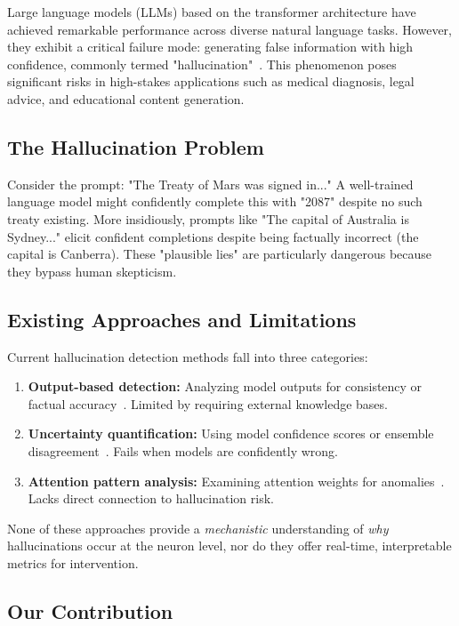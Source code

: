 Large language models (LLMs) based on the transformer architecture have achieved remarkable performance across diverse natural language tasks. However, they exhibit a critical failure mode: generating false information with high confidence, commonly termed "hallucination"~\cite{ji2023survey}. This phenomenon poses significant risks in high-stakes applications such as medical diagnosis, legal advice, and educational content generation.

\subsection{The Hallucination Problem}

Consider the prompt: "The Treaty of Mars was signed in..." A well-trained language model might confidently complete this with "2087" despite no such treaty existing. More insidiously, prompts like "The capital of Australia is Sydney..." elicit confident completions despite being factually incorrect (the capital is Canberra). These "plausible lies" are particularly dangerous because they bypass human skepticism.

\subsection{Existing Approaches and Limitations}

Current hallucination detection methods fall into three categories:

\begin{enumerate}
    \item \textbf{Output-based detection:} Analyzing model outputs for consistency or factual accuracy~\cite{manakul2023selfcheckgpt}. Limited by requiring external knowledge bases.
    \item \textbf{Uncertainty quantification:} Using model confidence scores or ensemble disagreement~\cite{kuhn2023semantic}. Fails when models are confidently wrong.
    \item \textbf{Attention pattern analysis:} Examining attention weights for anomalies~\cite{elhage2021mathematical}. Lacks direct connection to hallucination risk.
\end{enumerate}

None of these approaches provide a \textit{mechanistic} understanding of \textit{why} hallucinations occur at the neuron level, nor do they offer real-time, interpretable metrics for intervention.

\subsection{Our Contribution}

